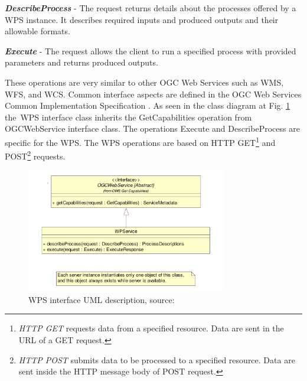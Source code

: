 \textbf{\textit{DescribeProcess}} - The request returns details about the processes offered by a WPS instance. 
It describes required inputs and produced outputs and their allowable formats.

\textbf{\textit{Execute}} - The request allows the client to run a specified process with provided parameters and returns
produced outputs.

\newpage
These operations are very similar to other OGC Web Services such as WMS, WFS, and WCS. Common interface aspects
are defined in the OGC Web Services Common Implementation Specification \cite{OGC_common}. As seen in 
the class diagram at Fig. \ref{fig:WPS_class_diagram} the~WPS interface class inherits the GetCapabilities operation 
from OGCWebService interface class. The operations Execute and DescribeProcess are specific for the WPS. The WPS
operations are based on HTTP GET\footnote{\textit{HTTP GET} requests data from a specified resource. Data are sent in the URL of a GET request.} and 
POST\footnote{\textit{HTTP POST} submits data to be processed to a specified resource. Data are sent inside the HTTP message body of
POST request.} requests.

\begin{figure}[h!]
\centering
\includegraphics[width=0.78\textwidth]{img/WPS_class_diagram.png}
\caption{WPS interface UML description, source: \cite{WPS_standart_1.0}}
\label{fig:WPS_class_diagram}
\end{figure}

